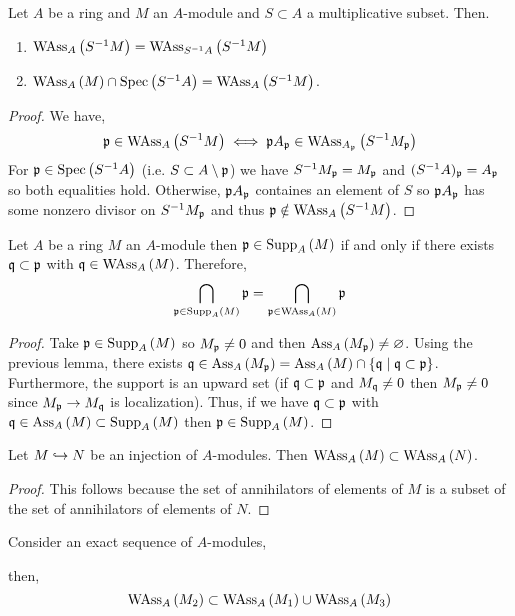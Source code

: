 \documentclass[12pt]{article}
\begin{document}
\begin{lemma} \label{ass_primes_localization}
Let $A$ be a ring and $M$ an $A$-module and $S \subset A$ a multiplicative subset. Then.
\begin{enumerate}
\item $\WAss{A}{S^{-1} M} = \WAss{S^{-1} A}{S^{-1} M}$ 
\item $\WAss{A}{M} \cap \Spec{S^{-1} A} = \WAss{A}{S^{-1} M}$.
\end{enumerate}
\end{lemma}

\begin{proof}
We have,
\[ \p \in \WAss{A}{S^{-1} M} \iff \p A_\p \in \WAss{A_\p}{S^{-1} M_\p}  \]
For $\p \in \Spec{S^{-1} A}$ (i.e. $S \subset A \setminus \p$) we have $S^{-1} M_\p = M_\p$ and $(S^{-1} A)_\p = A_\p$ so both equalities hold. Otherwise, $\p A_\p$ containes an element of $S$ so $\p A_\p$ has some nonzero divisor on $S^{-1} M_\p$ and thus $\p \notin \WAss{A}{S^{-1} M}$. 
\end{proof}


\begin{proposition}
Let $A$ be a ring $M$ an $A$-module then $\p \in \Supp{A}{M}$ if and only if there exists $\q \subset \p$ with $\q \in \WAss{A}{M}$. Therefore, \[ \bigcap_{\p \in \Supp{A}{M}} \p = \bigcap_{\p \in \WAss{A}{M}} \p \]
\end{proposition}

\begin{proof}
Take $\p \in \Supp{A}{M}$ so $M_\p \neq 0$ and then $\Ass{A}{M_\p} \neq \varnothing$. Using the previous lemma, there exists $\q \in \Ass{A}{M_\p} = \Ass{A}{M} \cap \{ \q \mid \q \subset \p \}$. Furthermore, the support is an upward set (if $\q \subset \p$ and $M_\q \neq 0$ then $M_\p \neq 0$ since $M_\p \to M_\q$ is localization). Thus, if we have $\q \subset \p$ with $\q \in \Ass{A}{M} \subset \Supp{A}{M}$ then $\p \in \Supp{A}{M}$.  
\end{proof}


\begin{lemma}
Let $M \embed N$ be an injection of $A$-modules. Then $\WAss{A}{M} \subset \WAss{A}{N}$.
\end{lemma}

\begin{proof}
This follows because the set of annihilators of elements of $M$ is a subset of the set of annihilators of elements of $N$.
\end{proof}

\begin{lemma} \label{exact_seq_weak_ass}
Consider an exact sequence of $A$-modules,
\begin{center}
\end{center}
then,
\[ \WAss{A}{M_2} \subset \WAss{A}{M_1} \cup \WAss{A}{M_3} \]
\end{lemma}
\end{document}
